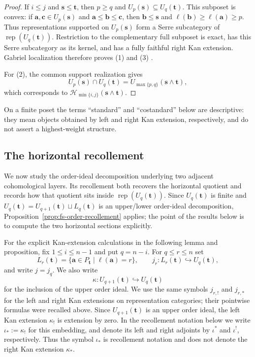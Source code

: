\documentclass[12pt,reqno]{amsart}
\theoremstyle{definition}
\theoremstyle{remark}
\newcommand{\Rep}{\operatorname{rep}}
\begin{document}
\begin{proof}
If $i\le j$ and $\mathbf s\le\mathbf t$, then $p\ge q$ and
$U_p(\mathbf s)\subseteq U_q(\mathbf t)$.  This subposet is convex: if
$\mathbf a,\mathbf c\in U_p(\mathbf s)$ and
$\mathbf a\le\mathbf b\le\mathbf c$, then
$\mathbf b\le\mathbf s$ and $\ell(\mathbf b)\ge\ell(\mathbf a)\ge p$.
Thus representations supported on $U_p(\mathbf s)$ form a Serre subcategory
of $\Rep(U_q(\mathbf t))$.  Restriction to the complementary full subposet is
exact, has this Serre subcategory as its kernel, and has a fully faithful
right Kan extension.  Gabriel localization therefore proves (1) and (3)
\cite{Gabriel}.

For (2), the common support realization gives
\[
U_p(\mathbf s)\cap U_q(\mathbf t)
=U_{\max\{p,q\}}(\mathbf s\wedge\mathbf t),
\]
which corresponds to
$\mathcal H_{\min\{i,j\}}(\mathbf s\wedge\mathbf t)$.
\end{proof}

On a finite poset the terms ``standard'' and ``costandard'' below are
descriptive: they mean objects obtained by left and right Kan extension,
respectively, and do not assert a highest-weight structure.

\subsection{The horizontal recollement}\label{subsec:horizontal-recollement}

We now study the order-ideal decomposition underlying two adjacent
cohomological layers.  Its recollement both recovers the horizontal quotient
and records how that quotient sits inside $\Rep(U_q(\mathbf t))$.  Since
$U_q(\mathbf t)$ is finite and
$U_q(\mathbf t)=U_{q+1}(\mathbf t)\sqcup L_q(\mathbf t)$ is an upper/lower
order-ideal decomposition, Proposition~\ref{prop:fs-order-recollement}
applies; the point of the results below is to compute the two horizontal
sections explicitly.

For the explicit Kan-extension calculations in the following lemma and
proposition, fix $1\le i\le n-1$ and put $q=n-i$.  For $q\le r\le n$ set
\[
L_r(\mathbf t)=\{\mathbf a\in P_{\mathbf t}\mid\ell(\mathbf a)=r\},
\qquad
j_r:L_r(\mathbf t)\hookrightarrow U_q(\mathbf t),
\]
and write $j=j_q$.  We also write
\[
\kappa:U_{q+1}(\mathbf t)\hookrightarrow U_q(\mathbf t)
\]
for the inclusion of the upper order ideal.  We use the same symbols
$j_{r,!}$ and $j_{r,*}$ for the left and right Kan extensions on
representation categories; their pointwise formulas were recalled above.
Since $U_{q+1}(\mathbf t)$ is an upper order ideal, the left Kan extension
$\kappa_!$ is extension by zero.  In the recollement notation below we write
$\iota_*:=\kappa_!$ for this embedding, and denote its left and right
adjoints by $\iota^*$ and $\iota^!$, respectively.  Thus the symbol
$\iota_*$ is recollement notation and does not denote the right Kan
extension $\kappa_*$.
\end{document}
